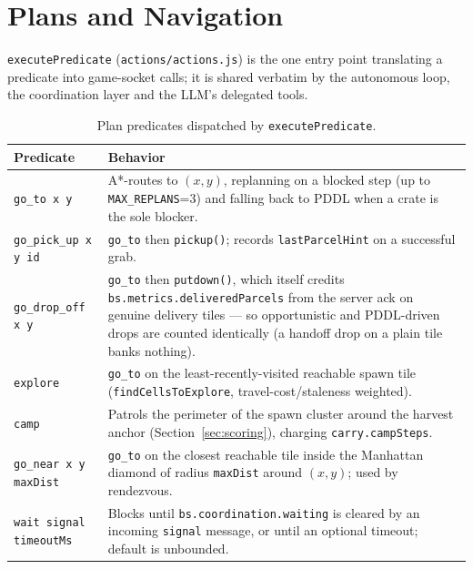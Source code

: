 \documentclass[11pt,a4paper]{article}
\begin{document}
\section{Plans and Navigation}
\label{sec:plans}

\texttt{executePredicate} (\texttt{actions/actions.js}) is the one entry point translating a
predicate into game-socket calls; it is shared verbatim by the autonomous loop, the
coordination layer and the LLM's delegated tools.

\begin{table}[htbp]
\centering
\footnotesize
\begin{tabular}{@{}p{2.4cm}p{9.9cm}@{}}
\toprule
\textbf{Predicate} & \textbf{Behavior} \\
\midrule
\texttt{go\_to x y} & A*-routes to $(x,y)$, replanning on a blocked step (up to \texttt{MAX\_REPLANS}=3) and falling back to PDDL when a crate is the sole blocker. \\
\texttt{go\_pick\_up x y id} & \texttt{go\_to} then \texttt{pickup()}; records \texttt{lastParcelHint} on a successful grab. \\
\texttt{go\_drop\_off x y} & \texttt{go\_to} then \texttt{putdown()}, which itself credits \texttt{bs.metrics.deliveredParcels} from the server ack on genuine delivery tiles --- so opportunistic and PDDL-driven drops are counted identically (a handoff drop on a plain tile banks nothing). \\
\texttt{explore} & \texttt{go\_to} on the least-recently-visited reachable spawn tile (\texttt{findCellsToExplore}, travel-cost/staleness weighted). \\
\texttt{camp} & Patrols the perimeter of the spawn cluster around the harvest anchor (Section~\ref{sec:scoring}), charging \texttt{carry.campSteps}. \\
\texttt{go\_near x y maxDist} & \texttt{go\_to} on the closest reachable tile inside the Manhattan diamond of radius \texttt{maxDist} around $(x,y)$; used by rendezvous. \\
\texttt{wait signal timeoutMs} & Blocks until \texttt{bs.coordination.waiting} is cleared by an incoming \texttt{signal} message, or until an optional timeout; default is unbounded. \\
\bottomrule
\end{tabular}
\caption{Plan predicates dispatched by \texttt{executePredicate}.}
\label{tab:plans}
\end{table}
\end{document}
